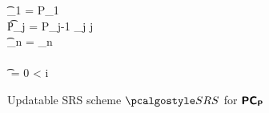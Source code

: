\begin{figure}[t!]
{{\begin{minipage}[t]{1.25\linewidth}
\begin{pcvstack}
\begin{pchstack}
{			\t \bP_1 = P_1 \\ [\myskip]
			\t P_j \bullet {} = P_{j-1} \bullet \hP_j \quad \forall j  \\ [\myskip]
			\t \bP_n \bullet {} =  \bullet \hP_n \\ [\myskip]
			 \\ [\myskip]
			\t {} \bullet {} =  \bullet {}  0 < i \leq \maxdeg %
		}
		\end{pchstack}
		\end{pcvstack}
		\end{minipage}}}
	\caption{Updatable SRS scheme $\SRScer$ for $\bm{\mathsf{PC}}_{\bm{\mathsf{P}}}$} 
	\label{fig:upd-scheme}
\end{figure}



